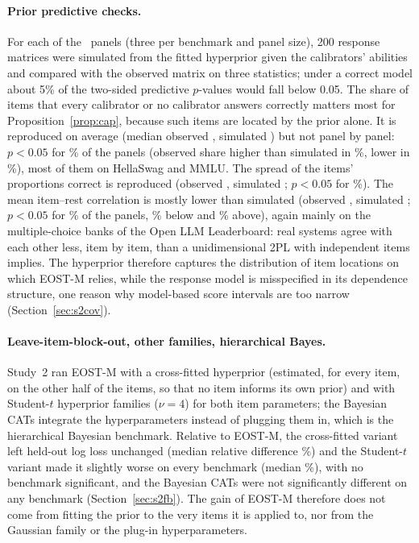 \paragraph{Prior predictive checks.} For each of the \PPCPanels\ panels (three per benchmark
and panel size), 200 response matrices were simulated from the fitted hyperprior given the
calibrators' abilities and compared with the observed matrix on three statistics; under a
correct model about 5\% of the two-sided predictive $p$-values would fall below 0.05. The
share of items that every calibrator or no calibrator answers correctly matters most for
Proposition~\ref{prop:cap}, because such items are located by the prior alone. It is
reproduced on average (median observed \PPCExtremeObs, simulated \PPCExtremeSim) but not
panel by panel: $p<0.05$ for \PPCExtremeLow\% of the panels (observed share higher than
simulated in \PPCExtremeAbove\%, lower in \PPCExtremeBelow\%), most of them on
HellaSwag and MMLU. The spread of the items' proportions correct is reproduced (observed
\PPCSdPObs, simulated \PPCSdPSim; $p<0.05$ for \PPCSdPLow\%). The mean item--rest
correlation is mostly lower than simulated (observed \PPCRestObs, simulated \PPCRestSim;
$p<0.05$ for \PPCRestLow\% of the panels, \PPCRestBelow\% below and \PPCRestAbove\% above),
again mainly on the multiple-choice banks of the Open LLM Leaderboard: real systems agree
with each other less, item by item, than a unidimensional 2PL with independent items
implies. The hyperprior therefore captures the distribution of item locations on which
EOST-M relies, while the response model is misspecified in its dependence structure, one
reason why model-based score intervals are too narrow (Section~\ref{sec:s2cov}).

\paragraph{Leave-item-block-out, other families, hierarchical Bayes.} Study~2 ran EOST-M
with a cross-fitted hyperprior (estimated, for every item, on the other half of the items,
so that no item informs its own prior) and with Student-$t$ hyperprior families ($\nu=4$) for
both item parameters; the Bayesian CATs integrate the hyperparameters instead of plugging
them in, which is the hierarchical Bayesian benchmark. Relative to EOST-M, the cross-fitted
variant left held-out log loss unchanged (median relative difference \SecXfVsEostMedAbs\%) and
the Student-$t$ variant made it slightly worse on every benchmark (median
\SecTpVsEostMedAbs\%), with no benchmark significant, and the Bayesian CATs were not
significantly different on any benchmark (Section~\ref{sec:s2fb}). The gain of
EOST-M therefore does not come from fitting the prior to the very items it is applied to,
nor from the Gaussian family or the plug-in hyperparameters.
